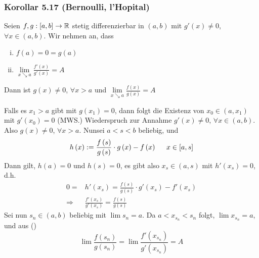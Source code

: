 \subsubsection*{Korollar 5.17 (Bernoulli, l'Hopital)}
Seien $f,g:\lbrack a,b\rbrack\to\mathbb{R}$ stetig differenzierbar in $\left( a,b\right)$ mit $g'(x)\not=0$, $\forall x\in\left( a,b\right)$. Wir nehmen an, dass 
\begin{enumerate}[(i)]
\item $f(a)=0=g(a)$
\item $\mathop {\lim }\limits_{x \searrow a} \frac{{f'\left( x \right)}}{{g'\left( x \right)}} = A$
\end{enumerate}
Dann ist $g(x)\not=0$, $\forall x>a$ und $\mathop {\lim }\limits_{x \searrow a} \frac{{f\left( x \right)}}{{g\left( x \right)}} = A$

\begin{beweis}{}
Falls es $x_1>a$ gibt mit $g\left( x_1\right)=0$, dann folgt die Existenz von $x_0\in\left( a,x_1\right)$ mit $g'\left( x_0\right)=0$ (MWS.)
Wiederspruch zur Annahme $g'(x)\not=0$, $\forall x\in\left( a,b\right)$. Also $g(x)\not=0$, $\forall x>a$. Nunsei $a<s<b$ beliebig, und 
\[h\left( x \right): = \frac{{f\left( s \right)}}{{g\left( s \right)}} \cdot g\left( x \right) - f\left( x \right)\hspace{5mm}x \in \left[ {a,s} \right]\]
Dann gilt, $h(a)=0$ und $h(s)=0$, es gibt also $x_s\in\left( a,s\right)$ mit $h'\left( x_s\right)=0$, d.h. 
\begin{align*}
0 =& h'\left( {{x_s}} \right) = \frac{{f\left( s \right)}}{{g\left( s \right)}} \cdot g'\left( {{x_s}} \right) - f'\left( {{x_s}} \right)\\
 \Rightarrow& \frac{{f'\left( {{x_s}} \right)}}{{g'\left( {{x_s}} \right)}} = \frac{{f\left( s \right)}}{{g\left( s \right)}}\tag{\textasteriskcentered}
\end{align*}
Sei nun $s_n\in\left( a,b\right)$ beliebig mit $\lim s_n=a$. Da $a<x_{s_n}<s_n$ folgt, $\lim x_{s_n}=a$, und aus (\textasteriskcentered)
\[\lim \frac{{f\left( {{s_n}} \right)}}{{g\left( {{s_n}} \right)}} = \lim \frac{{f'\left( {{x_{{s_n}}}} \right)}}{{g'\left( {{x_{{s_n}}}} \right)}} = A\]
\end{beweis}

